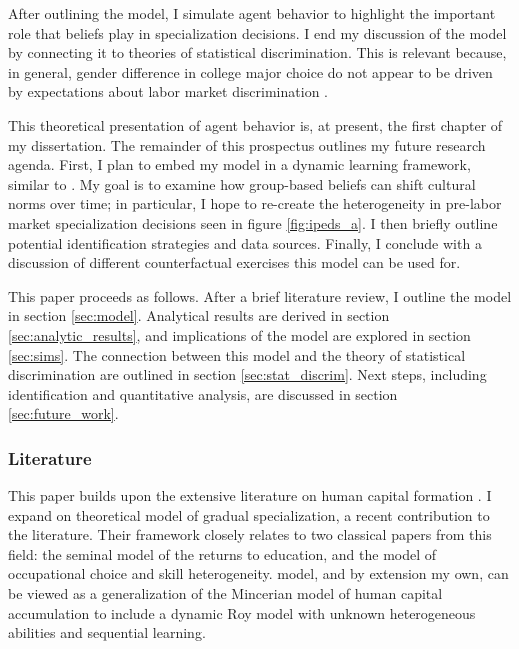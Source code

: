 After outlining the model, I simulate agent behavior to highlight the important role that beliefs play in specialization decisions.
I end my discussion of the model by connecting it to theories of statistical discrimination. 
This is relevant because, in general, gender difference in college major choice do not appear to be driven by expectations about labor market discrimination \parencite{Z13}.

This theoretical presentation of agent behavior is, at present, the first chapter of my dissertation. 
The remainder of this prospectus outlines my future research agenda.
First, I plan to embed my model in a dynamic learning framework, similar to \textcite{F13}.
My goal is to examine how group-based beliefs can shift cultural norms over time; in particular, I hope to re-create the heterogeneity in pre-labor market specialization decisions seen in figure \eqref{fig:ipeds_a}.
I then briefly outline potential identification strategies and data sources. Finally, I conclude with a discussion of different counterfactual exercises this model can be used for.

This paper proceeds as follows. After a brief literature review, I outline the model in section \ref{sec:model}. Analytical results are derived in section \ref{sec:analytic_results}, and implications of the model are explored in section \ref{sec:sims}. The connection between this model and the theory of statistical discrimination are outlined in section \ref{sec:stat_discrim}. Next steps, including identification and quantitative analysis, are discussed in section \ref{sec:future_work}.

\subsubsection*{Literature}

This paper builds upon the extensive literature on human capital formation \parencite{B62,B67,M74,R83}. 
I expand on  theoretical model of gradual specialization, a recent contribution to the literature. 
Their framework closely relates to two classical papers from this field:
the seminal \textcite{M74} model of the returns to education, 
and the \textcite{R51} model of occupational choice and skill heterogeneity.
 model, and by extension my own, can be viewed as a generalization of the Mincerian model of human capital accumulation to include a dynamic Roy model with unknown heterogeneous abilities and sequential learning.

